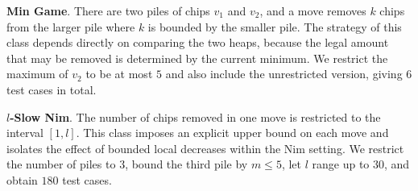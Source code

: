 \documentclass[review]{elsarticle}
\newcommand{\set}[1]{\{ #1 \}}
\newcommand{\tuple}[1]{\langle {#1} \rangle}
\newcommand{\true}{\top}
\newcommand{\statevar}{\mathcal{X}}
\newcommand{\act}{\mathcal{A}}
\newcommand{\constraint}{\mathcal{C}}
\newcommand{\estate}{\mathcal{E}}
\newcommand{\pre}{\mathtt{pre}}
\newcommand{\eff}{\mathtt{eff}}
\begin{document}
\textbf{Min Game}. There are two piles of chips $v_1$ and $v_2$, and a move removes $k$ chips from the larger pile where $k$ is bounded by the smaller pile.
The strategy of this class depends directly on comparing the two heaps, because the legal amount that may be removed is determined by the current minimum.
We restrict the maximum of $v_2$ to be at most $5$ and also include the unrestricted version, giving $6$ test cases in total.

\textbf{$l$-Slow Nim}. The number of chips removed in one move is restricted to the interval $[1,l]$.
This class imposes an explicit upper bound on each move and isolates the effect of bounded local decreases within the Nim setting.
We restrict the number of piles to $3$, bound the third pile by $m \le 5$, let $l$ range up to $30$, and obtain $180$ test cases.
\end{document}
